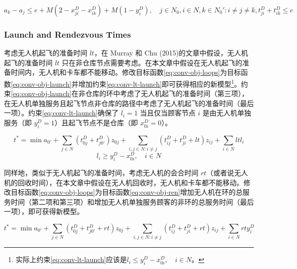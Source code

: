 \documentclass[fontset=none]{ctexart}
\begin{document}
\begin{corollary}
    \begin{equation}
        a_k - a_j \leq e + M\left(2 - x_{ji}^D - x_{ik}^D\right) + M\left(1 - y_i^D\right), \quad j \in N_0, i \in N, k \in N_0': i \neq j \neq k, t_{ji}^D + t_{ik}^D \leq e \tag{7a}\label{eq:conv-time-land}
    \end{equation}
\end{corollary}

\subsubsection{Launch and Rendezvous Times}
考虑无人机起飞的准备时间 $lt$，在 Murray 和 Chu (2015)\cite{murrayFlyingSidekickTraveling2015}的文章中假设，无人机起飞的准备时间 $lt$ 只在非仓库节点需要考虑。在本文章中假设在无人机起飞的准备时间内，无人机和卡车都不能移动。修改目标函数\cref{eq:conv-obj-loops}为目标函数\cref{eq:conv-obj-launch}并增加约束\cref{eq:conv-lt-launch}即可获得相应的新模型\footnote{实际上约束\cref{eq:conv-lt-launch}应该是$l_i \leq y_i^D - x_{0i}^D, \quad i \in N$。}。约束\cref{eq:conv-obj-launch}在非仓库的环中考虑了无人机起飞的准备时间（第三项），在无人机单独服务且起飞节点非仓库的路径中考虑了无人机起飞的准备时间（最后一项）。约束\cref{eq:conv-lt-launch}确保了 $l_i = 1$ 当且仅当顾客节点 $i$ 是由无人机单独服务（即 $y_i^D = 1$）且起飞节点不是仓库（即 $x_{0i}^D = 0$）。 

\begin{corollary}
    \begin{equation}
        t^* = \min a_{0'} + \sum_{j \in N}\left(t_{0j}^D + t_{j0'}^D\right)z_{0j} + \sum_{i,j \in N: i\neq j}\left(t_{ij}^D + t_{ji}^D + lt\right)z_{ij} + \sum_{i \in N}lt l_i \tag{8}\label{eq:conv-obj-launch}
    \end{equation}
    \begin{equation}
        l_i \geq y_i^D - x_{0i}^D, \quad i \in N \tag{9}\label{eq:conv-lt-launch}
    \end{equation}
\end{corollary}

同样地，类似于无人机起飞的准备时间，考虑无人机的会合时间 $rt$（或者说无人机的回收时间），在本文章中假设在无人机回收时，无人机和卡车都不能移动。修改目标函数\cref{eq:conv-obj-loops}为目标函数\cref{eq:conv-obj-ren}增加无人机在环的总服务时间（第二项和第三项）和增加无人机单独服务顾客的非环的总服务时间（最后一项），即可获得新模型。

\begin{corollary}
    \begin{equation}
        t^* = \min a_{0'} + \sum_{j \in N}\left(t_{0j}^D + t_{j0'}^D + rt\right)z_{0j} + \sum_{i,j \in N: i\neq j}\left(t_{ij}^D + t_{ji}^D + rt\right)z_{ij} + \sum_{i \in N}rt y_i^D \tag{9b}\label{eq:conv-obj-ren}
    \end{equation}
\end{corollary}
\end{document}
